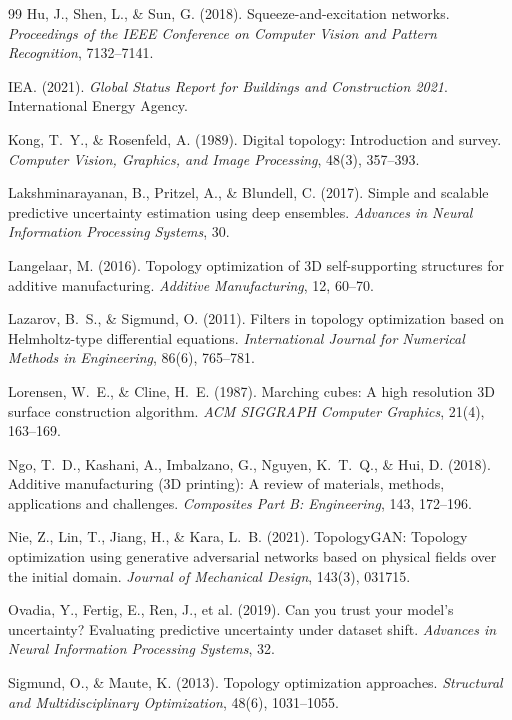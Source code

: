 \documentclass[11pt]{article}
\theoremstyle{plain}
\theoremstyle{definition}
\theoremstyle{remark}
\begin{document}
\begin{thebibliography}{99}
Hu, J., Shen, L., \& Sun, G. (2018). Squeeze-and-excitation networks. \emph{Proceedings of the IEEE Conference on Computer Vision and Pattern Recognition}, 7132--7141.

IEA. (2021). \emph{Global Status Report for Buildings and Construction 2021}. International Energy Agency.

Kong, T.~Y., \& Rosenfeld, A. (1989). Digital topology: Introduction and survey. \emph{Computer Vision, Graphics, and Image Processing}, 48(3), 357--393.

Lakshminarayanan, B., Pritzel, A., \& Blundell, C. (2017). Simple and scalable predictive uncertainty estimation using deep ensembles. \emph{Advances in Neural Information Processing Systems}, 30.

Langelaar, M. (2016). Topology optimization of 3D self-supporting structures for additive manufacturing. \emph{Additive Manufacturing}, 12, 60--70.

Lazarov, B.~S., \& Sigmund, O. (2011). Filters in topology optimization based on Helmholtz-type differential equations. \emph{International Journal for Numerical Methods in Engineering}, 86(6), 765--781.

Lorensen, W.~E., \& Cline, H.~E. (1987). Marching cubes: A high resolution 3D surface construction algorithm. \emph{ACM SIGGRAPH Computer Graphics}, 21(4), 163--169.

Ngo, T.~D., Kashani, A., Imbalzano, G., Nguyen, K.~T.~Q., \& Hui, D. (2018). Additive manufacturing (3D printing): A review of materials, methods, applications and challenges. \emph{Composites Part B: Engineering}, 143, 172--196.

Nie, Z., Lin, T., Jiang, H., \& Kara, L.~B. (2021). TopologyGAN: Topology optimization using generative adversarial networks based on physical fields over the initial domain. \emph{Journal of Mechanical Design}, 143(3), 031715.

Ovadia, Y., Fertig, E., Ren, J., et al. (2019). Can you trust your model's uncertainty? Evaluating predictive uncertainty under dataset shift. \emph{Advances in Neural Information Processing Systems}, 32.

Sigmund, O., \& Maute, K. (2013). Topology optimization approaches. \emph{Structural and Multidisciplinary Optimization}, 48(6), 1031--1055.


\end{thebibliography}
\end{document}
